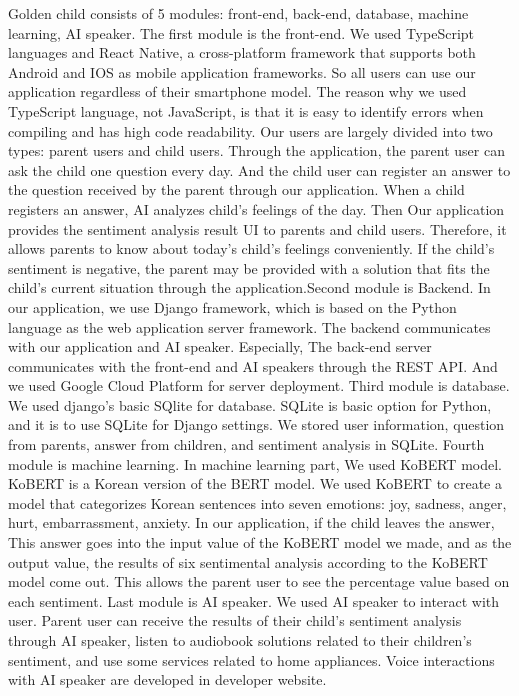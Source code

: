 \documentclass[conference]{IEEEtran}
\begin{document}
Golden child consists of 5 modules: front-end, back-end, database, machine learning, AI speaker. The first module is the front-end. We used TypeScript languages and React Native, a cross-platform framework that supports both Android and IOS as mobile application frameworks. So all users can use our application regardless of their smartphone model. The reason why we used TypeScript language, not JavaScript, is that it is easy to identify errors when compiling and has high code readability. Our users are largely divided into two types: parent users and child users. Through the application, the parent user can ask the child one question every day. And the child user can register an answer to the question received by the parent through our application. When a child registers an answer, AI analyzes child’s feelings of the day. Then Our application provides the sentiment analysis result UI to parents and child users. Therefore, it allows parents to know about today's child's feelings conveniently. If the child's sentiment is negative, the parent may be provided with a solution that fits the child's current situation through the application.Second module is Backend. In our application, we use Django framework, which is based on the Python language as the web application server framework. The backend communicates with our application and AI speaker. Especially, The back-end server communicates with the front-end and AI speakers through the REST API. And we used Google Cloud Platform for server deployment.
Third  module is database. We used django’s basic SQlite for database. SQLite is basic option for Python, and it is to use SQLite for Django settings. We stored user information, question from parents, answer from children, and sentiment analysis in SQLite. Fourth module is machine learning. In machine learning part, We used KoBERT model. KoBERT is a Korean version of the BERT model. We used KoBERT to create a model that categorizes Korean sentences into seven emotions: joy, sadness, anger, hurt, embarrassment, anxiety. In our application, if the child leaves the answer, This answer goes into the input value of the KoBERT model we made, and as the output value, the results of six sentimental analysis according to the KoBERT model come out. This allows the parent user to see the percentage value based on each sentiment. Last module is AI speaker. We used AI speaker to interact with user. Parent user can receive the results of their child's sentiment analysis through AI speaker, listen to audiobook solutions related to their children's sentiment, and use some services related to home appliances. Voice interactions with AI speaker are developed in developer website.
\end{document}
